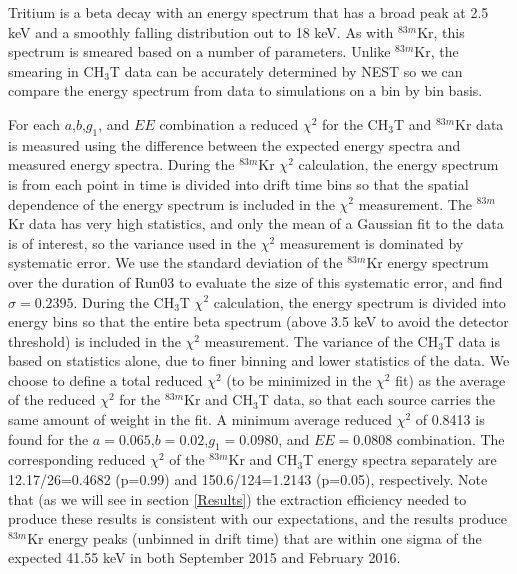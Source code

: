 \documentclass[a4paper,12pt]{article}
\begin{document}
{Tritium is a beta decay with an energy spectrum that has a broad peak at 2.5 keV and a smoothly falling distribution out to 18 keV.  As with $^{83m}$Kr, this spectrum is smeared based on a number of parameters.  Unlike $^{83m}$Kr, the smearing in CH$_3$T data can be accurately determined by NEST so we can compare the energy spectrum from data to simulations on a bin by bin basis. 

For each $a$,$b$,$g_1$, and $EE$ combination a reduced $\chi^2$ for the CH$_3$T and $^{83m}$Kr data is measured using the difference between the expected energy spectra and measured energy spectra.   During the $^{83m}$Kr $\chi^2$ calculation, the energy spectrum is from each point in time is divided into drift time bins so that the spatial dependence of the energy spectrum is included in the $\chi^2$ measurement.  The $^{83m}$Kr data has very high statistics, and only the mean of a Gaussian fit to the data is of interest, so the variance used in the $\chi^2$  measurement  is dominated by systematic error.  We use the standard deviation of the $^{83m}$Kr energy spectrum over the duration of Run03 to evaluate the size of this systematic error, and find $\sigma = 0.2395$.  During the CH$_3$T $\chi^2$  calculation, the energy spectrum is divided into energy bins so that the entire beta spectrum (above 3.5 keV to avoid the detector threshold) is included in the $\chi^2$ measurement.  The variance of the CH$_3$T data is based on statistics alone, due to finer binning and lower statistics of the data.  We choose to define a total reduced $\chi^2$ (to be minimized in the $\chi^2$ fit) as the average of the reduced $\chi^2$ for the $^{83m}$Kr and CH$_3$T data, so that each source carries the same amount of weight in the fit. A minimum average reduced  $\chi^2$ of 0.8413 is found for the $a=0.065$,$b=0.02$,$g_1=0.0980$, and $EE=0.0808$ combination.  The corresponding reduced $\chi^2$ of the $^{83m}$Kr and CH$_3$T energy spectra separately are 12.17/26=0.4682 (p=0.99) and 150.6/124=1.2143 (p=0.05), respectively. Note that (as we will see in section \ref{Results}) the extraction efficiency needed to produce these results is consistent with our expectations, and the results produce $^{83m}$Kr energy peaks (unbinned in drift time) that are within one sigma of the expected 41.55 keV in both September 2015 and February 2016. 


}
\end{document}
